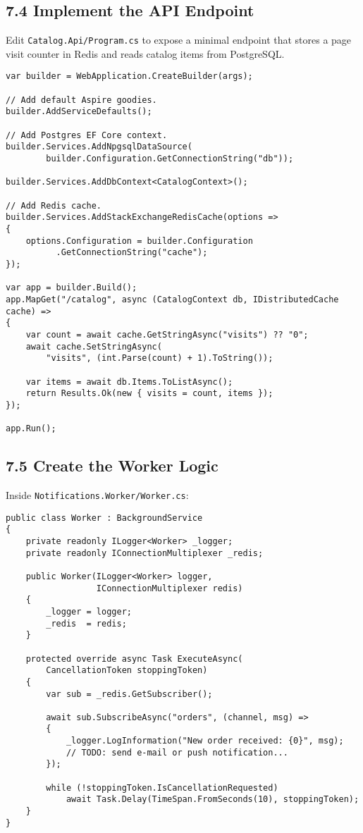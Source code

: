 \documentclass[table]{article}
\begin{document}
\subsection*{7.4 \faEdit\enspace Implement the API Endpoint}
Edit \verb|Catalog.Api/Program.cs| to expose a minimal endpoint that stores a
page visit counter in Redis and reads catalog items from PostgreSQL.

\begin{verbatim}
var builder = WebApplication.CreateBuilder(args);

// Add default Aspire goodies.
builder.AddServiceDefaults();

// Add Postgres EF Core context.
builder.Services.AddNpgsqlDataSource(
        builder.Configuration.GetConnectionString("db"));

builder.Services.AddDbContext<CatalogContext>();

// Add Redis cache.
builder.Services.AddStackExchangeRedisCache(options =>
{
    options.Configuration = builder.Configuration
          .GetConnectionString("cache");
});

var app = builder.Build();
app.MapGet("/catalog", async (CatalogContext db, IDistributedCache cache) =>
{
    var count = await cache.GetStringAsync("visits") ?? "0";
    await cache.SetStringAsync(
        "visits", (int.Parse(count) + 1).ToString());

    var items = await db.Items.ToListAsync();
    return Results.Ok(new { visits = count, items });
});

app.Run();
\end{verbatim}

\subsection*{7.5 \faCodeBranch\enspace Create the Worker Logic}
Inside \verb|Notifications.Worker/Worker.cs|:

\begin{verbatim}
public class Worker : BackgroundService
{
    private readonly ILogger<Worker> _logger;
    private readonly IConnectionMultiplexer _redis;

    public Worker(ILogger<Worker> logger,
                  IConnectionMultiplexer redis)
    {
        _logger = logger;
        _redis  = redis;
    }

    protected override async Task ExecuteAsync(
        CancellationToken stoppingToken)
    {
        var sub = _redis.GetSubscriber();

        await sub.SubscribeAsync("orders", (channel, msg) =>
        {
            _logger.LogInformation("New order received: {0}", msg);
            // TODO: send e-mail or push notification...
        });

        while (!stoppingToken.IsCancellationRequested)
            await Task.Delay(TimeSpan.FromSeconds(10), stoppingToken);
    }
}
\end{verbatim}
\end{document}
